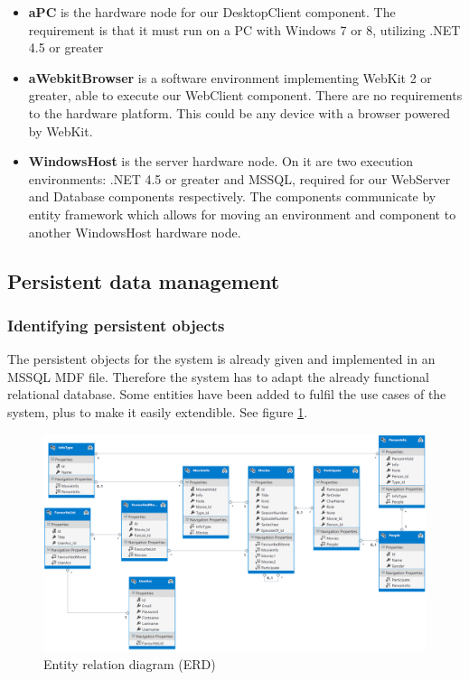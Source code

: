 \begin{itemize}
\item \textbf{aPC} is the hardware node for our DesktopClient component. The requirement is that it must run on a PC with Windows 7 or 8, utilizing .NET 4.5 or greater
\item \textbf{aWebkitBrowser} is a software environment implementing WebKit 2 or greater, able to execute our WebClient component. There are no requirements to the hardware platform. This could be any device with a browser powered by WebKit.
\item \textbf{WindowsHost} is the server hardware node. On it are two execution environments: .NET 4.5 or greater and MSSQL, required for our WebServer and Database components respectively. The components communicate by entity framework which allows for moving an environment and component to another WindowsHost hardware node.
\end{itemize}

\subsection{Persistent data management}
\subsubsection{Identifying persistent objects}
The persistent objects for the system is already given and implemented in an MSSQL MDF file. Therefore the system has to adapt the already functional relational database. Some entities have been added to fulfil the use cases of the system, plus to make it easily extendible. See figure \ref{fig:ER Diagram}.

\begin{figure}[H]
\includegraphics[width=\linewidth]{img/SDD/ER.png}
\caption{Entity relation diagram (ERD)}
\label{fig:ER Diagram}
\end{figure}

